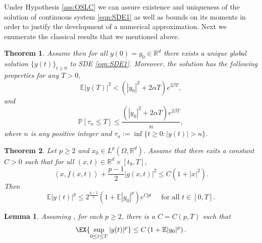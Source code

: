 \documentclass[sort&compress, preprint]{elsarticle}
\theoremstyle{definition}
\theoremstyle{plain}%
\newtheorem{thm}{Theorem}[section]
\newtheorem{lem}{Lemma}[section]
\theoremstyle{remark}
\newcommand{\ms}[1]{\mathbb{E}\left|#1\right|^2}
\newcommand{\mep}[1]{\mathbb{E}|#1|^p}
\newcommand{\m}[1]{\mathbb{E}#1}
\newcommand{\Prob}[1]{\mathbb{P}\left[#1\right]}
\newcommand{\innerprod}[2]{\left\langle#1, #2\right\rangle}
\begin{document}
Under Hypothesis \ref{ass:OSLC} we can assure  existence and uniqueness 
of the solution of continuous system \eqref{eqn:SDE1}  as well as bounds on its moments
 in order to justify the development of a numerical approximation. Next we enumerate the classical 
 results that we mentioned above.
%
\begin{thm}
	Assume   then for all $y(0)=y_0\in \mathbb{R}^d$   there exists a 
	unique global solution $\{y(t)\}_{t\geq 0}$ to SDE \eqref{eqn:SDE1}. Moreover, the solution has the 
	following properties for any $T>0$,
	\begin{equation*}
		\ms{y(T)}< 
		\left(
			|y_0|^2 +2\alpha T 
		\right)e^{2\beta T},
	\end{equation*}
	and
	\begin{equation*}
	\Prob{\tau_n\leq T}
	\leq \frac{
		\left(
		|y_0|^2 +2\alpha T 
		\right)
		e^{2\beta T}
	}{n},
	\end{equation*}
	where $n$ is any positive integer and 
	$\tau_n := \inf \{ t\geq 0 : |y(t)|>n\}$.
\end{thm}
%
\begin{thm}
	\label{thm:MaoCoercive}
	Let $p\geq 2$ and $x_0\in L^p(\Omega, \mathbb{R}^d)$. Assume that there exits a constant $C>0$
	such that for all $(x,t)\in \mathbb{R}^d\times [t_0,T]$,
	\begin{equation*}
	\innerprod{x}{f(x,t)}+\frac{p-1}{2}|g(x,t)|^2 \leq C(1+|x|^2).
	\end{equation*}
	Then
	\begin{equation*}
	\m|y(t)|^p
	\leq
	2^{\frac{p-2}{2}}
	\left(
	1 + \m|y_0|^p
	\right)e^{Cpt} \quad \text{ for all } t\in[0,T].
	\end{equation*}
\end{thm}
%
\begin{lem}
	\label{lem:MomentBound}
	Assuming , for each $p\geq 2$, there is a $C=C(p,T)$ such that
	\begin{equation*}
	\EX{\sup_{0\leq t \leq T}|y(t)|^p}\leq C \left(1+\mep{y_0}\right).
	\end{equation*}
\end{lem}
\end{document}
